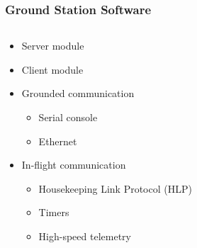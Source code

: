 \documentclass[landscape,xcolor={table}]{beamer}
\begin{document}
	\begin{frame}
		
		\frametitle{Ground Station Software}
		
		\begin{columns}[T] %
		\begin{column}{.53\textwidth}

			 \begin{itemize}
				  	\item{Server module}
				  	\item{Client module}
				  	\item{Grounded communication}
				  	\begin{itemize}
				  		\item{Serial console}
				  		\item{Ethernet}
				  	\end{itemize}
				  	\item{In-flight communication}
					\begin{itemize}
				  		\item{Housekeeping Link Protocol (HLP)}
				  		\item{Timers}
				  		\item{High-speed telemetry}
				  	\end{itemize}
			 \end{itemize}
			
		\end{column}%
		\hfill%
		\begin{column}{.45\textwidth}


\end{column}
\end{columns}
\end{frame}
\end{document}
